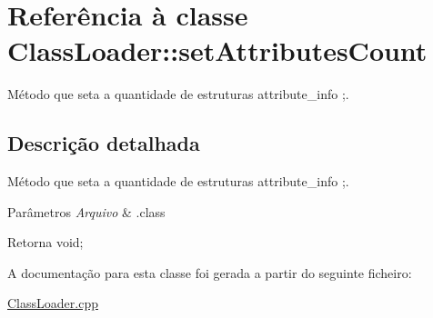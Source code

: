 \hypertarget{class_class_loader_1_1set_attributes_count}{}\section{Referência à classe Class\+Loader\+:\+:set\+Attributes\+Count}
\label{class_class_loader_1_1set_attributes_count}


Método que seta a quantidade de estruturas attribute\+\_\+info ;.  




\subsection{Descrição detalhada}
Método que seta a quantidade de estruturas attribute\+\_\+info ;. 


\begin{DoxyParams}{Parâmetros}
{\em Arquivo} & .class \\
\hline
\end{DoxyParams}
\begin{DoxyReturn}{Retorna}
void; 
\end{DoxyReturn}


A documentação para esta classe foi gerada a partir do seguinte ficheiro\+:\begin{DoxyCompactItemize}
\item 
\hyperlink{_class_loader_8cpp}{Class\+Loader.\+cpp}\end{DoxyCompactItemize}
